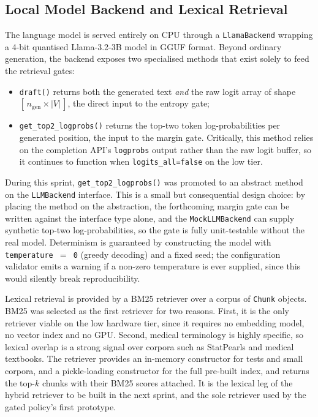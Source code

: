 \subsection{Local Model Backend and Lexical Retrieval}
\label{sec:impl-model-retrieval}

The language model is served entirely on CPU through a \texttt{LlamaBackend}
wrapping a 4-bit quantised Llama-3.2-3B model in GGUF format. Beyond ordinary
generation, the backend exposes two specialised methods that exist solely to
feed the retrieval gates:

\begin{itemize}
  \item \texttt{draft()} returns both the generated text \emph{and} the raw
        logit array of shape $[\,n_{\text{gen}} \times |V|\,]$, the direct
        input to the entropy gate;
  \item \texttt{get\_top2\_logprobs()} returns the top-two token
        log-probabilities per generated position, the input to the margin
        gate. Critically, this method relies on the completion API's
        \texttt{logprobs} output rather than the raw logit buffer, so it
        continues to function when \texttt{logits\_all=false} on the low tier.
\end{itemize}

During this sprint, \texttt{get\_top2\_logprobs()} was promoted to an abstract
method on the \texttt{LLMBackend} interface. This is a small but consequential
design choice: by placing the method on the abstraction, the forthcoming
margin gate can be written against the interface type alone, and the
\texttt{MockLLMBackend} can supply synthetic top-two log-probabilities, so the
gate is fully unit-testable without the real model. Determinism is guaranteed
by constructing the model with \texttt{temperature\,$=$\,0} (greedy decoding)
and a fixed seed; the configuration validator emits a warning if a non-zero
temperature is ever supplied, since this would silently break reproducibility.

Lexical retrieval is provided by a BM25 retriever over a corpus of
\texttt{Chunk} objects. BM25 was selected as the first retriever for two
reasons. First, it is the only retriever viable on the low hardware tier,
since it requires no embedding model, no vector index and no GPU. Second,
medical terminology is highly specific, so lexical overlap is a strong signal
over corpora such as StatPearls and medical textbooks. The retriever provides
an in-memory constructor for tests and small corpora, and a pickle-loading
constructor for the full pre-built index, and returns the top-$k$ chunks with
their BM25 scores attached. It is the lexical leg of the hybrid retriever to
be built in the next sprint, and the sole retriever used by the gated policy's
first prototype.

